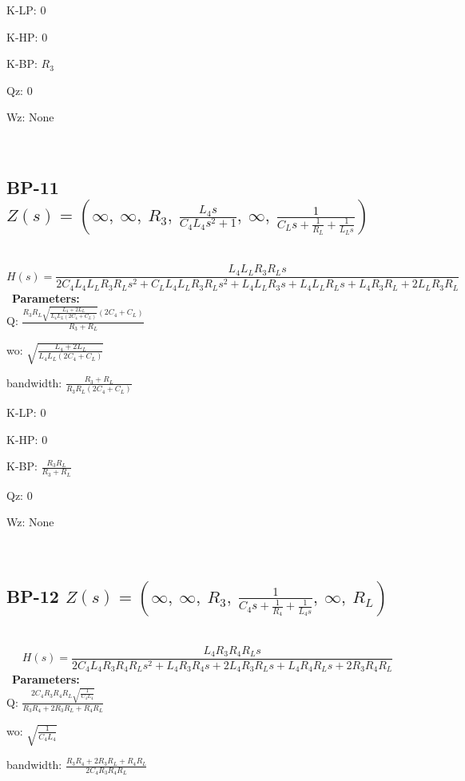 \documentclass{article}
\begin{document}
K-LP: $0$\ 

K-HP: $0$\ 

K-BP: $R_{3}$\ 

Qz: $0$\ 

Wz: $\text{None}$\ 

\ 

\subsection{BP-11 $Z(s) = \left( \infty, \  \infty, \  R_{3}, \  \frac{L_{4} s}{C_{4} L_{4} s^{2} + 1}, \  \infty, \  \frac{1}{C_{L} s + \frac{1}{R_{L}} + \frac{1}{L_{L} s}}\right)$ } \ 
\textbf{\[H(s) = \frac{L_{4} L_{L} R_{3} R_{L} s}{2 C_{4} L_{4} L_{L} R_{3} R_{L} s^{2} + C_{L} L_{4} L_{L} R_{3} R_{L} s^{2} + L_{4} L_{L} R_{3} s + L_{4} L_{L} R_{L} s + L_{4} R_{3} R_{L} + 2 L_{L} R_{3} R_{L}}\] } \ 
\textbf{Parameters:}\\ 

Q: $\frac{R_{3} R_{L} \sqrt{\frac{L_{4} + 2 L_{L}}{L_{4} L_{L} \left(2 C_{4} + C_{L}\right)}} \left(2 C_{4} + C_{L}\right)}{R_{3} + R_{L}}$\ 

wo: $\sqrt{\frac{L_{4} + 2 L_{L}}{L_{4} L_{L} \left(2 C_{4} + C_{L}\right)}}$\ 

bandwidth: $\frac{R_{3} + R_{L}}{R_{3} R_{L} \left(2 C_{4} + C_{L}\right)}$\ 

K-LP: $0$\ 

K-HP: $0$\ 

K-BP: $\frac{R_{3} R_{L}}{R_{3} + R_{L}}$\ 

Qz: $0$\ 

Wz: $\text{None}$\ 

\ 

\subsection{BP-12 $Z(s) = \left( \infty, \  \infty, \  R_{3}, \  \frac{1}{C_{4} s + \frac{1}{R_{4}} + \frac{1}{L_{4} s}}, \  \infty, \  R_{L}\right)$ } \ 
\textbf{\[H(s) = \frac{L_{4} R_{3} R_{4} R_{L} s}{2 C_{4} L_{4} R_{3} R_{4} R_{L} s^{2} + L_{4} R_{3} R_{4} s + 2 L_{4} R_{3} R_{L} s + L_{4} R_{4} R_{L} s + 2 R_{3} R_{4} R_{L}}\] } \ 
\textbf{Parameters:}\\ 

Q: $\frac{2 C_{4} R_{3} R_{4} R_{L} \sqrt{\frac{1}{C_{4} L_{4}}}}{R_{3} R_{4} + 2 R_{3} R_{L} + R_{4} R_{L}}$\ 

wo: $\sqrt{\frac{1}{C_{4} L_{4}}}$\ 

bandwidth: $\frac{R_{3} R_{4} + 2 R_{3} R_{L} + R_{4} R_{L}}{2 C_{4} R_{3} R_{4} R_{L}}$\ 
\end{document}
